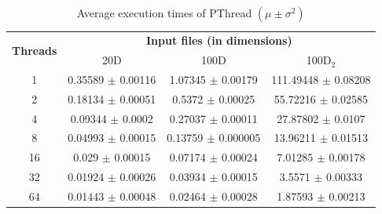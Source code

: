\documentclass[11pt, journal]{IEEEtran}
\begin{document}
\begin{table}
    \renewcommand{\arraystretch}{1.3}
    \caption{Average execution times of PThread $\left(\mu \pm \sigma^2\right)$}
    \label{pt_timings_table}
    \centering
    \begin{tabular}{|c||c|c|c|}
    \hline
    \multirow{2}{*}{\textbf{Threads}} & \multicolumn{3}{c|}{\textbf{Input files (in dimensions)}} \\\cline{2-4}
     & 20D & 100D & 100D$_2$ \\
    \hline\hline
    1 & 0.35589 $\pm$ 0.00116 & 1.07345 $\pm$ 0.00179 & 111.49448 $\pm$ 0.08208 \\
    \cline{2-4} 
    2 & 0.18134 $\pm$ 0.00051 & 0.5372 $\pm$ 0.00025 & 55.72216 $\pm$ 0.02585 \\
    \cline{2-4} 
    4 & 0.09344 $\pm$ 0.0002 & 0.27037 $\pm$ 0.00011 & 27.87802 $\pm$ 0.0107 \\
    \cline{2-4} 
    8 & 0.04993 $\pm$ 0.00015 & 0.13759 $\pm$ 0.000005 & 13.96211 $\pm$ 0.01513 \\
    \cline{2-4} 
    16 & 0.029 $\pm$ 0.00015 & 0.07174 $\pm$ 0.00024 & 7.01285 $\pm$ 0.00178 \\
    \cline{2-4} 
    32 & 0.01924 $\pm$ 0.00026 & 0.03934 $\pm$ 0.00015 & 3.5571 $\pm$ 0.00333 \\
    \cline{2-4} 
    64 & 0.01443 $\pm$ 0.00048 & 0.02464 $\pm$ 0.00028 & 1.87593 $\pm$ 0.00213 \\
    \hline
    \end{tabular}
\end{table}
\end{document}
